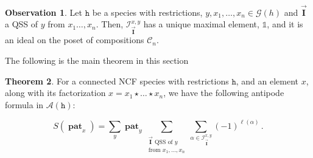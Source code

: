 \documentclass[12pt, reqno]{amsart}
\theoremstyle{definition}
\newtheorem{thm}{Theorem}[section]
\newtheorem{obs}[thm]{Observation}
\newcommand{\III}{\vec{\mathbf{I}}}
\DeclareMathOperator{\pat}{\mathbf{pat}}
\begin{document}
\


\begin{obs}
Let $\mathtt{h}$ be a species with restrictions, $y, x_1, \dots, x_n \in \mathcal G(h)$ and $\III$ a QSS of $y$ from $x_1\dots, x_n$.
Then, $\mathcal I^{x, y}_{\III}$ has a unique maximal element, $\mathbb{1}$, and it is an ideal on the poset of compositions $\mathcal C_n$.
\end{obs}

The following is the main theorem in this section

\begin{thm}\label{thm:general_antipode}
For a connected NCF species with restrictions $\mathtt{h}$, and an element $x$, along with its factorization $x=x_1 \star \dots \star x_n$, we have the following antipode formula in $\mathcal A (\mathtt{h})$:

$$S(\pat_x) = \sum_y \pat_y \sum_{\substack{\III \text{ QSS of $y$}\\ \text{from }x_1, \dots , x_n}}  \sum_{\alpha \in \mathcal I^{x, y}_{\III}} (-1)^{\ell ( \alpha)} \, .$$
\end{thm}
\end{document}
